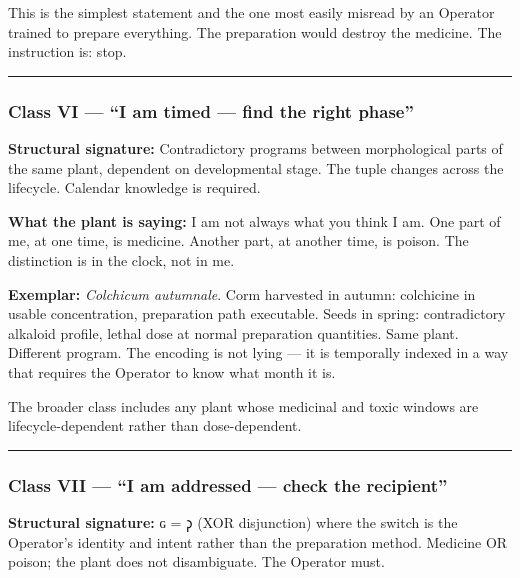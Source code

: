 \documentclass[12pt,a4paper]{article}
\begin{document}
This is the simplest statement and the one most easily misread by an
Operator trained to prepare everything. The preparation would destroy
the medicine. The instruction is: stop.

\begin{center}\rule{0.5\linewidth}{0.5pt}\end{center}

\hypertarget{class-vi-i-am-timed-find-the-right-phase}{%
\subsubsection{Class VI --- ``I am timed --- find the right
phase''}\label{class-vi-i-am-timed-find-the-right-phase}}

\textbf{Structural signature:} Contradictory programs between
morphological parts of the same plant, dependent on developmental stage.
The tuple changes across the lifecycle. Calendar knowledge is required.

\textbf{What the plant is saying:} I am not always what you think I am.
One part of me, at one time, is medicine. Another part, at another time,
is poison. The distinction is in the clock, not in me.

\textbf{Exemplar:} \emph{Colchicum autumnale}. Corm harvested in autumn:
colchicine in usable concentration, preparation path executable. Seeds
in spring: contradictory alkaloid profile, lethal dose at normal
preparation quantities. Same plant. Different program. The encoding is
not lying --- it is temporally indexed in a way that requires the
Operator to know what month it is.

The broader class includes any plant whose medicinal and toxic windows
are lifecycle-dependent rather than dose-dependent.

\begin{center}\rule{0.5\linewidth}{0.5pt}\end{center}

\hypertarget{class-vii-i-am-addressed-check-the-recipient}{%
\subsubsection{Class VII --- ``I am addressed --- check the
recipient''}\label{class-vii-i-am-addressed-check-the-recipient}}

\textbf{Structural signature:} ɢ = 𐑜 (XOR disjunction) where the switch
is the Operator's identity and intent rather than the preparation
method. Medicine OR poison; the plant does not disambiguate. The
Operator must.
\end{document}
